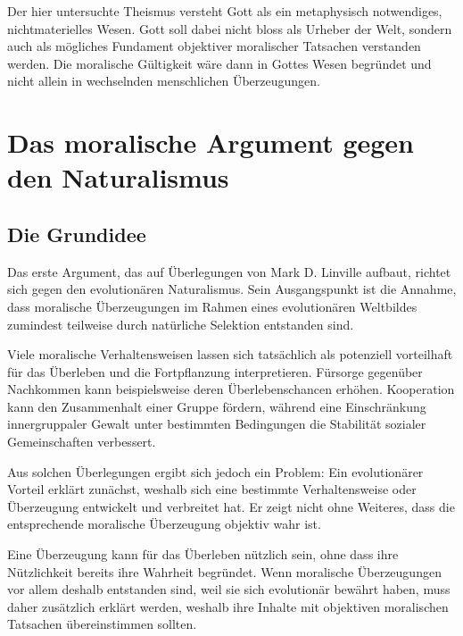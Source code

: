 \documentclass[a4paper,11pt]{article}
\begin{document}
	Der hier untersuchte Theismus versteht Gott als ein metaphysisch
	notwendiges, nichtmaterielles Wesen. Gott soll dabei nicht bloss
	als Urheber der Welt, sondern auch als mögliches Fundament
	objektiver moralischer Tatsachen verstanden werden. Die moralische
	Gültigkeit wäre dann in Gottes Wesen begründet und nicht allein
	in wechselnden menschlichen Überzeugungen.
	
	\section{Das moralische Argument gegen den Naturalismus}
	
	\subsection{Die Grundidee}
	
	Das erste Argument, das auf Überlegungen von Mark D. Linville
	aufbaut, richtet sich gegen den evolutionären Naturalismus. Sein
	Ausgangspunkt ist die Annahme, dass moralische Überzeugungen im
	Rahmen eines evolutionären Weltbildes zumindest teilweise durch
	natürliche Selektion entstanden sind.
	
	Viele moralische Verhaltensweisen lassen sich tatsächlich als
	potenziell vorteilhaft für das Überleben und die Fortpflanzung
	interpretieren. Fürsorge gegenüber Nachkommen kann beispielsweise
	deren Überlebenschancen erhöhen. Kooperation kann den Zusammenhalt
	einer Gruppe fördern, während eine Einschränkung innergruppaler
	Gewalt unter bestimmten Bedingungen die Stabilität sozialer
	Gemeinschaften verbessert.
	
	Aus solchen Überlegungen ergibt sich jedoch ein Problem: Ein
	evolutionärer Vorteil erklärt zunächst, weshalb sich eine bestimmte
	Verhaltensweise oder Überzeugung entwickelt und verbreitet hat.
	Er zeigt nicht ohne Weiteres, dass die entsprechende moralische
	Überzeugung objektiv wahr ist.
	
	Eine Überzeugung kann für das Überleben nützlich sein, ohne dass
	ihre Nützlichkeit bereits ihre Wahrheit begründet. Wenn moralische
	Überzeugungen vor allem deshalb entstanden sind, weil sie sich
	evolutionär bewährt haben, muss daher zusätzlich erklärt werden,
	weshalb ihre Inhalte mit objektiven moralischen Tatsachen
	übereinstimmen sollten.
	
\end{document}
